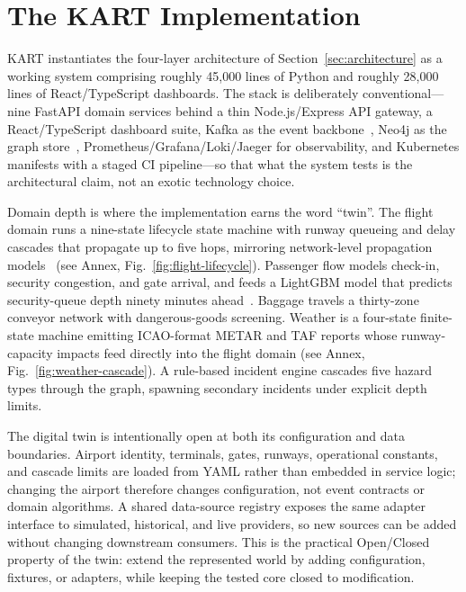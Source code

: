 \documentclass[runningheads]{llncs}
\begin{document}
\section{The KART Implementation}\label{sec:implementation}

KART instantiates the four-layer architecture of Section~\ref{sec:architecture} as a working system comprising roughly 45{,}000 lines of Python and roughly 28{,}000 lines of React/TypeScript dashboards. The stack is deliberately conventional---nine FastAPI domain services behind a thin Node.js/Express API gateway, a React/TypeScript dashboard suite, Kafka as the event backbone~\cite{kreps2011}, Neo4j as the graph store~\cite{angles2008}, Prometheus/Grafana/Loki/Jaeger for observability, and Kubernetes manifests with a staged CI pipeline---so that what the system tests is the architectural claim, not an exotic technology choice.

Domain depth is where the implementation earns the word ``twin''. The flight domain runs a nine-state lifecycle state machine with runway queueing and delay cascades that propagate up to five hops, mirroring network-level propagation models~\cite{pyrgiotis2013} (see Annex, Fig.~\ref{fig:flight-lifecycle}). Passenger flow models check-in, security congestion, and gate arrival, and feeds a LightGBM model that predicts security-queue depth ninety minutes ahead~\cite{ke2017,schultz2019}. Baggage travels a thirty-zone conveyor network with dangerous-goods screening. Weather is a four-state finite-state machine emitting ICAO-format METAR and TAF reports whose runway-capacity impacts feed directly into the flight domain (see Annex, Fig.~\ref{fig:weather-cascade}). A rule-based incident engine cascades five hazard types through the graph, spawning secondary incidents under explicit depth limits.

The digital twin is intentionally open at both its configuration and data boundaries. Airport identity, terminals, gates, runways, operational constants, and cascade limits are loaded from YAML rather than embedded in service logic; changing the airport therefore changes configuration, not event contracts or domain algorithms. A shared data-source registry exposes the same adapter interface to simulated, historical, and live providers, so new sources can be added without changing downstream consumers. This is the practical Open/Closed property of the twin: extend the represented world by adding configuration, fixtures, or adapters, while keeping the tested core closed to modification.
\end{document}
